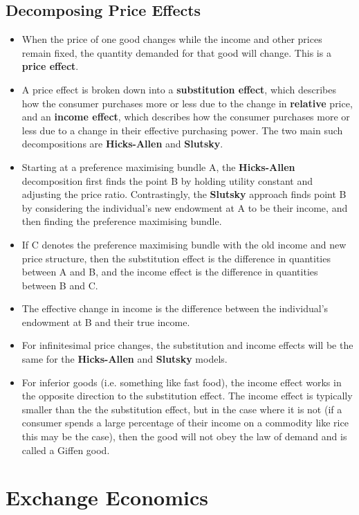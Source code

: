 \documentclass[a4paper]{article}
\begin{document}
\subsection{Decomposing Price Effects}
\begin{itemize}
    \item When the price of one good changes while the income and other prices remain fixed, the quantity demanded for that good will change. This is a \textbf{price effect}.
    \item A price effect is broken down into a \textbf{substitution effect}, which describes how the consumer purchases more or less due to the change in \textbf{relative} price, and an \textbf{income effect}, which describes how the consumer purchases more or less due to a change in their effective purchasing power. The two main such decompositions are \textbf{Hicks-Allen} and \textbf{Slutsky}.
    \item Starting at a preference maximising bundle A, the \textbf{Hicks-Allen} decomposition first finds the point B by holding utility constant and adjusting the price ratio. Contrastingly, the \textbf{Slutsky} approach finds point B by considering the individual's new endowment at A to be their income, and then finding the preference maximising bundle.
    \item If C denotes the preference maximising bundle with the old income and new price structure, then the substitution effect is the difference in quantities between A and B, and the income effect is the difference in quantities between B and C.
    \item The effective change in income is the difference between the individual's endowment at B and their true income.
    \item For infinitesimal price changes, the substitution and income effects will be the same for the \textbf{Hicks-Allen} and \textbf{Slutsky} models.
    \item For inferior goods (i.e. something like fast food), the income effect works in the opposite direction to the substitution effect. The income effect is typically smaller than the the substitution effect, but in the case where it is not (if a consumer spends a large percentage of their income on a commodity like rice this may be the case), then the good will not obey the law of demand and is called a Giffen good.
\end{itemize}

\section{Exchange Economics}
\end{document}
